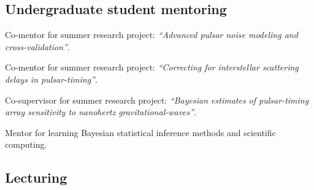 \documentclass[11pt,letterpaper,sans]{moderncv}
\begin{document}
\subsection{Undergraduate student mentoring}

\vspace{-0.1cm}
\hspace{0.71cm} Co-mentor for summer research project: \textit{``Advanced pulsar noise modeling and cross-validation''}. %

\vspace{-0.1cm}
\hspace{0.71cm} Co-mentor for summer research project: \textit{``Correcting for interstellar scattering \\ \vspace{-0.1cm}
\hspace{0.6cm} delays in pulsar-timing''}. \vspace{0.1cm}

\vspace{-0.1cm}
\hspace{0.71cm} Co-supervisor for summer research project: \textit{``Bayesian estimates of pulsar-timing \\ \vspace{-0.1cm}
\hspace{0.6cm} array sensitivity to nanohertz gravitational-waves''}. \vspace{0.1cm}

 \vspace{-0.1cm}
\hspace{0.71cm} Mentor for learning Bayesian statistical inference methods and scientific computing.


\subsection{Lecturing}
\end{document}
